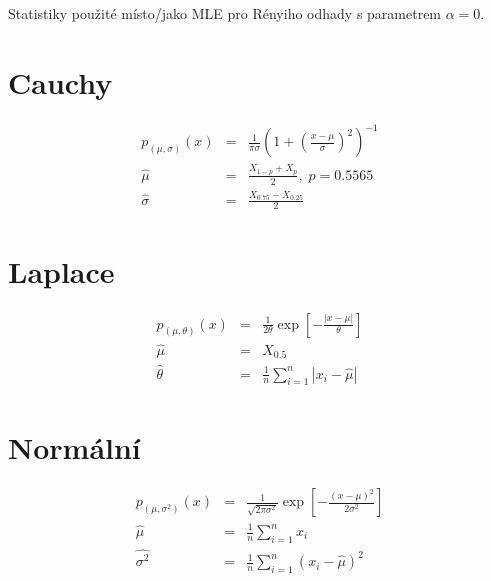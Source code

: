 \documentclass[11pt, a4paper]{article}
\begin{document}
Statistiky použité místo/jako MLE pro Rényiho odhady s parametrem $ \alpha = 0 $.

\section*{Cauchy}
\begin{eqnarray}
p_{(\mu,\sigma)}(x) & = & \frac{1}{\pi \sigma} \left( 1 + \left( \frac{x - \mu}{\sigma} \right) ^2 \right)^{-1} \nonumber \\
\hat{\mu} & = & \frac{X_{1-p} + X_{p}}{2}, \; p = 0.5565 \nonumber \\
\hat{\sigma} & = & \frac{X_{0.75} - X_{0.25}}{2} \nonumber
\end{eqnarray}

\section*{Laplace}
\begin{eqnarray}
p_{(\mu,\theta)}(x) & = &  {\frac{1}{2\theta} \exp{ \left[ -\frac{|x -\mu |}{\theta } \right] }} \nonumber \\
\hat{\mu} & = & X_{0.5} \nonumber \\
\hat{\theta} & = & \frac{1}{n} \sum_{i=1}^n |x_i-\hat{\mu}| \nonumber
\end{eqnarray}

\section*{Normální}
\begin{eqnarray}
p_{(\mu,\sigma^2)}(x) & = &  {\frac{1}{\sqrt{2\pi\sigma^2}} \exp{ \left[ -\frac{(x -\mu )^2}{2\sigma^2} \right] }} \nonumber \\
\hat{\mu} & = & \frac{1}{n} \sum_{i=1}^n x_i  \nonumber \\
\hat{\sigma^2} & = & \frac{1}{n} \sum_{i=1}^n (x_i-\hat{\mu})^2 \nonumber
\end{eqnarray}
\end{document}
